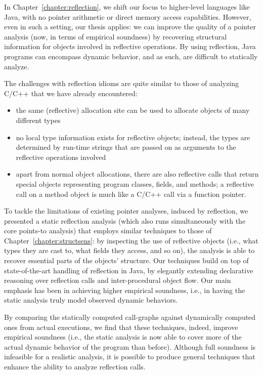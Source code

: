 In Chapter~\ref{chapter:reflection}, we shift our focus to
higher-level languages like Java, with no pointer arithmetic or direct
memory access capabilities. However, even in such a setting, our thesis
applies: we can improve the quality of a pointer analysis (now, in
terms of empirical soundness) by recovering structural information for
objects involved in reflective operations. By using reflection, Java
programs can encompass dynamic behavior, and as such, are difficult to
statically analyze.

The challenges with reflection idioms are quite similar to those of
analyzing C/C++ that we have already encountered:
\begin{itemize}[\(\cdot\)]
\item the same (reflective) allocation site can be used to allocate
  objects of many different types
\item no local type information exists for reflective objects;
  instead, the types are determined by run-time strings that are passed
  on as arguments to the reflective operations involved
\item apart from normal object allocations, there are also reflective
  calls that return special objects representing program classes,
  fields, and methods; a reflective call on a method object is much
  like a C/C++ call via a function pointer.
\end{itemize}

To tackle the limitations of existing pointer analyses, induced by
reflection, we presented a static reflection analysis (which also runs
simultaneously with the core points-to analysis) that employs similar
techniques to those of Chapter~\ref{chapter:structsens}: by inspecting
the use of reflective objects (i.e., what types they are cast to, what
fields they access, and so on), the analysis is able to recover
essential parts of the objects' structure. Our techniques build on top
of state-of-the-art handling of reflection in Java, by elegantly
extending declarative reasoning over reflection calls and
inter-procedural object flow. Our main emphasis has been in achieving
higher empirical soundness, i.e., in having the static analysis truly
model observed dynamic behaviors.

By comparing the statically computed call-graphs against dynamically
computed ones from actual executions, we find that these techniques,
indeed, improve empirical soundness (i.e., the static analysis is now
able to cover more of the actual dynamic behavior of the program than
before). Although full soundness is infeasible for a realistic
analysis, it is possible to produce general techniques that enhance
the ability to analyze reflection calls.

